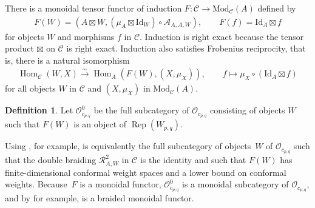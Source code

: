 \documentclass[pdftex]{sigma}
\numberwithin{equation}{section}
\theoremstyle{definition}
\newtheorem{Definition}[Theorem]{Definition}
\begin{document}
There is a monoidal tensor functor of induction $F\colon \mathcal{C}\rightarrow\mathrm{Mod}_\mathcal{C}(A)$ defined by
\begin{gather*}
F(W) = (A\boxtimes W,(\mu_A\boxtimes\mathrm{Id}_W)\circ\mathcal{A}_{A,A,W}),\qquad F(f)=\mathrm{Id}_A\boxtimes f
\end{gather*}
for objects $W$ and morphisms $f$ in $\mathcal{C}$. Induction is right exact because the tensor product $\boxtimes$ on $\mathcal{C}$ is right exact. Induction also satisfies Frobenius reciprocity, that is, there is a natural isomorphism
\begin{align}\label{eqn:Frob-rec}
\operatorname{Hom}_{\mathcal{C}}(W, X) \xrightarrow{ \sim } \operatorname{Hom}_{A}(F(W), (X,\mu_X)),\qquad
 f \longmapsto \mu_X\circ(\mathrm{Id}_A\boxtimes f)
\end{align}
for all objects $W$ in $\mathcal{C}$ and $(X,\mu_X)$ in $\mathrm{Mod}_\mathcal{C}(A)$.
\begin{Definition}
Let $\mathcal{O}_{c_{p,q}}^0$ be the full subcategory of $\mathcal{O}_{c_{p,q}}$ consisting of objects $W$ such that $F(W)$ is an object of $\operatorname{Rep}(W_{p,q})$.
\end{Definition}

Using \cite[Proposition 2.65]{CKM1}, for example,  is equivalently the full subcategory of objects~$W$ of $\mathcal{O}_{c_{p,q}}$ such that the double braiding $\mathcal{R}_{A,W}^2$ in $\mathcal{C}$ is the identity and such that $F(W)$ has finite-dimensional conformal weight spaces and a lower bound on conformal weights.
Because~$F$ is a monoidal functor, $\mathcal{O}_{c_{p,q}}^0$ is a monoidal subcategory of $\mathcal{O}_{c_{p,q}}$, and by
 \cite[Theorem~2.67]{CKM1} for example,  is a braided monoidal functor.
\end{document}
